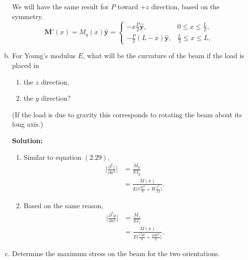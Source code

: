 \documentclass[12pt]{article}
\begin{document}
\begin{enumerate}[(a)]
	      We will have the same result for $P$ toward $+z$ direction, based on the symmetry.
	      \begin{equation}
		      \bm{M}'(x) = M_y(x) \hat{\bm{y}}
		      = \begin{cases}
			      -x \frac{ P }{ 2 } \hat{\bm{y}},      & 0 \le x \le \frac{L}{2},     \\
			      -\frac{ P }{ 2 } (L - x)\hat{\bm{y}}, & \frac{ L }{ 2 } \le x \le L,
		      \end{cases}
	      \end{equation}

	\item For Young's modulus $E$, what will be the curvature of the beam if the load is placed in
	      \begin{enumerate}[(b1)]
		      \item the $z$ direction,
		      \item the $y$ direction?
	      \end{enumerate}
	      (If the load is due to gravity this corresponds to rotating the beam about its long axis.)

	      \textbf{Solution:}
	      \begin{enumerate}[(b1)]
		      \item Similar to equation $(2.29)$,
		            \begin{equation}
			            \begin{split}
				            \bigg| \frac{ \partial^2 z }{ \partial  x^2} \bigg| &= \frac{ M_y }{ E I_y }\\
				            &= \frac{ M(x) }{ E  \big( t \frac{ W^3 }{ 6 } + W \frac{ t^3 }{ 12 } \big)}.
			            \end{split}
		            \end{equation}
		      \item Based on the same reason,
		            \begin{equation}
			            \begin{split}
				            \bigg| \frac{ \partial^2 y }{ \partial x^2 } \bigg| &= \frac{ M_z }{ E I_z } \\
				            &= \frac{ M(x) }{ E \big( \frac{t^3 W}{6} + \frac{4 t W^3}{3} \big)}.
			            \end{split}
		            \end{equation}
	      \end{enumerate}
	\item Determine the maximum stress on the beam for the two orientations.


\end{enumerate}
\end{document}
